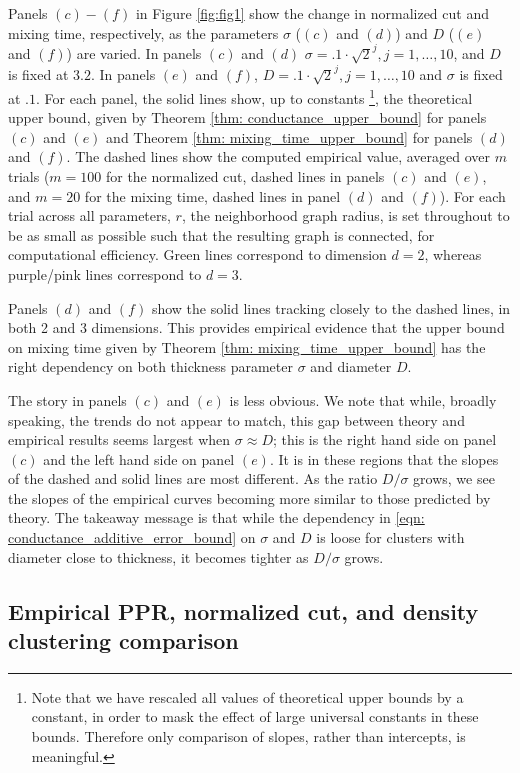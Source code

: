 \documentclass{article}
\newcommand{\1}{\mathbf{1}}
\theoremstyle{aldenthm}
\theoremstyle{aldenrmrk}
\begin{document}
Panels $(c) - (f)$ in Figure \ref{fig:fig1} show the change in normalized cut and mixing time, respectively, as the parameters $\sigma$ ($(c)$ and $(d)$) and $D$ ($(e)$ and $(f)$) are varied. In panels $(c)$ and $(d)$ $\sigma = .1 \cdot \sqrt{2}^j, j = 1,\ldots,10$, and $D$ is fixed at $3.2$. In panels $(e)$ and $(f)$, $D = .1 \cdot \sqrt{2}^j, j = 1,\ldots,10$ and $\sigma$ is fixed at $.1$.
For each panel, the solid lines show, up to constants \footnote{Note that we have rescaled all values of theoretical upper bounds by a constant, in order to mask the effect of large universal constants in these bounds. Therefore only comparison of slopes, rather than intercepts, is meaningful.}, the theoretical upper bound, given by Theorem \ref{thm: conductance_upper_bound} for panels $(c)$ and $(e)$ and Theorem \ref{thm: mixing_time_upper_bound} for panels $(d)$ and $(f)$. The dashed lines show the computed empirical value, averaged over $m$ trials ($m = 100$ for the normalized cut, dashed lines in panels $(c)$ and $(e)$, and $m = 20$ for the mixing time, dashed lines in panel $(d)$ and $(f)$). For each trial across all parameters, $r$, the neighborhood graph radius, is set throughout to be as small as possible such that the resulting graph is connected, for computational efficiency. Green lines correspond to dimension $d = 2$, whereas purple/pink lines correspond to $d = 3$. 

Panels $(d)$ and $(f)$ show the solid lines tracking closely to the dashed lines, in both 2 and 3 dimensions. This provides empirical evidence that the upper bound on mixing time given by Theorem \ref{thm: mixing_time_upper_bound} has the right dependency on both thickness parameter  $\sigma$ and diameter $D$.

The story in panels $(c)$ and $(e)$ is less obvious. We note that while, broadly speaking, the trends do not appear to match, this gap between theory and empirical results seems largest when $\sigma \approx D$; this is the right hand side on panel $(c)$ and the left hand side on panel $(e)$. It is in these regions that the slopes of the dashed and solid lines are most different. As the ratio $D/\sigma$ grows, we see the slopes of the empirical curves becoming more similar to those predicted by theory. The takeaway message is that while the dependency in \eqref{eqn: conductance_additive_error_bound} on $\sigma$ and $D$ is loose for clusters with diameter close to thickness, it becomes tighter as $D/\sigma$ grows.


\subsection{Empirical PPR, normalized cut, and density clustering comparison}
\end{document}
